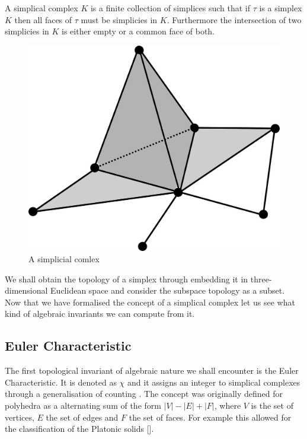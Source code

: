 \begin{defn} A simplical complex $K$ is a finite collection of simplices such that if $\tau$ is a simplex $K$ then all faces of $\tau$ must be simplicies in $K$. Furthermore the intersection of two simplicies in $K$ is either empty or a common face of both.  \end{defn}


\begin{figure}[h]%
    \centering
    \includegraphics[center, scale=0.03 ]{./images/simplex/complex.eps}
    \caption{A simplicial comlex}%
    \label{fig:case1.1}%
\end{figure}

We shall obtain the topology of a simplex through embedding it in three-dimensional Euclidean space and consider the subspace topology as a subset. Now that we have formalised the concept of a simplical complex let us see what kind of algebraic invariants we can compute from it.


\subsection{Euler Characteristic}

The first topological invariant of algebraic nature we shall encounter is the Euler Characteristic. It is denoted as $\chi$ and it assigns an integer to simplical complexes through a generalisation of counting \cite{elementary-applied-topology}. The concept was originally defined for polyhedra as a alternating sum of the form $|V| - |E| + |F|$, where $V$ is the set of vertices, $E$ the set of edges and $F$ the set of faces. For example this allowed for the classification of the Platonic solids [].

